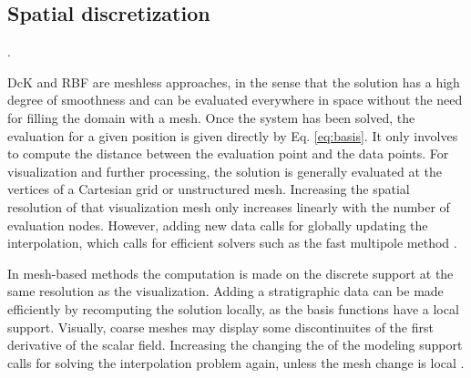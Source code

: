 \documentclass[final]{ring20}
\begin{document}
{%

\subsection{Spatial discretization}.

DcK and RBF are meshless approaches, in the sense that the solution has a high degree of smoothness and can be evaluated everywhere in space without the need for filling the domain with a mesh. Once the system has been solved, the evaluation for a given position is given directly by Eq. \ref{eq:basis}. It only involves to compute the distance between the evaluation point and the data points. For visualization and further processing, the solution is generally evaluated at the vertices of a Cartesian grid or unstructured mesh. Increasing the spatial resolution of that visualization mesh only increases linearly with the number of evaluation nodes. However, adding new data calls for globally updating the interpolation, which calls for efficient solvers such as the fast multipole method \citep{greengard_fast_1987}. 

In mesh-based methods the computation is made on the discrete support at the same resolution as the visualization. Adding a stratigraphic data can be made efficiently by recomputing the solution locally, as the basis functions have a local support. Visually, coarse meshes may display some discontinuites of the first derivative of the scalar field. Increasing the changing the of the modeling support calls for solving the interpolation problem again, unless the mesh change is local \citep{Frank2007CG}. 

}
\end{document}
